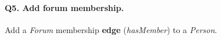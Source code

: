 \paragraph{\textbf{Q5}. Add forum membership.}
Add a \emph{Forum} membership \textbf{edge} (\emph{hasMember}) to a
\emph{Person}.
